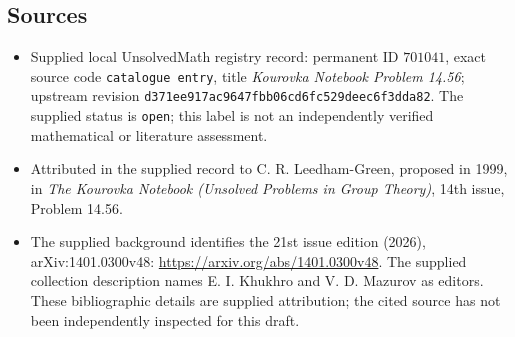 \documentclass[11pt]{article}
\begin{document}
\subsection{Sources}
\begin{itemize}
\item Supplied local UnsolvedMath registry record: permanent ID \(701041\), exact source code \texttt{catalogue entry}, title \emph{Kourovka Notebook Problem 14.56}; upstream revision \texttt{d371ee917ac9647fbb06cd6fc529deec6f3dda82}. The supplied status is \texttt{open}; this label is not an independently verified mathematical or literature assessment.
\item Attributed in the supplied record to C. R. Leedham-Green, proposed in 1999, in \emph{The Kourovka Notebook (Unsolved Problems in Group Theory)}, 14th issue, Problem 14.56.
\item The supplied background identifies the 21st issue edition (2026), arXiv:1401.0300v48: \url{https://arxiv.org/abs/1401.0300v48}. The supplied collection description names E. I. Khukhro and V. D. Mazurov as editors. These bibliographic details are supplied attribution; the cited source has not been independently inspected for this draft.
\end{itemize}
\end{document}

